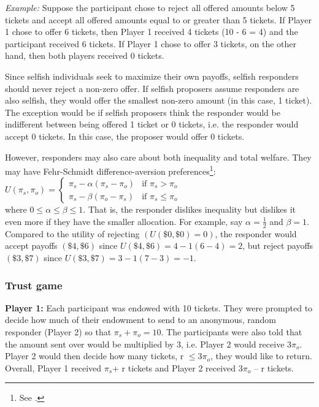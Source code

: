 \documentclass[12pt]{article}
\begin{document}
\textit{Example:} Suppose the participant chose to reject all offered amounts below 5 tickets and accept all offered amounts equal to or greater than 5 tickets. If Player 1 chose to offer 6 tickets, then Player 1 received 4 tickets (10 - 6 = 4) and the participant received 6 tickets. If Player 1 chose to offer 3 tickets, on the other hand, then both players received 0 tickets. 

Since selfish individuals seek to maximize their own payoffs, selfish responders should never reject a non-zero offer. If selfish proposers assume responders are also selfish, they would offer the smallest non-zero amount (in this case, 1 ticket). The exception would be if selfish proposers think the responder would be indifferent between being offered 1 ticket or 0 tickets, i.e. the responder would accept 0 tickets. In this case, the proposer would offer 0 tickets.


However, responders may also care about both inequality and total welfare. They may have Fehr-Schmidt difference-aversion preferences\footnote{See \cite{fehr_schmidt_1999}.}:\\

$ U(\pi_{s}, \pi_{o})  = \begin{cases}
      \pi_{s} - \alpha(\pi_{s} - \pi_{o}) & \text{if }\pi_{s} > \pi_{o} \\
      \pi_{s} - \beta(\pi_{o} - \pi_{s}) & \text{if }\pi_{s} \leq \pi_{o}
    \end{cases}\, $ \\

\noindent where $ 0 \leq \alpha \leq \beta \leq 1$. That is, the responder dislikes inequality but dislikes it even more if they have the smaller allocation. For example, say $\alpha = \frac{1}{2}$ and $\beta=1$. Compared to the utility of rejecting \((U(\$0, \$0) = 0)\), the responder would accept payoffs \((\$4, \$6)\) since \(U(\$4, \$6) = 4 - 1(6 - 4) =  2\), but reject payoffs \((\$3, \$7)\) since \(U(\$3,  \$7) = 3 - 1(7 - 3) = -1\).

	
\subsubsection{Trust game}
\textbf{Player 1:} Each participant was endowed with 10 tickets. They were prompted to decide how much of their endowment to send to an anonymous, random responder (Player 2) so that \(\pi_{s} + \pi_{o} = 10\). The participants were also told that the amount sent over would be multiplied by 3, i.e. Player 2 would receive 3\(\pi_{o}\). Player 2 would then decide how many tickets, r \(\leq 3\pi_{o}\), they would like to return. Overall, Player 1 received \(\pi_{s}\)+ r tickets and Player 2 received 3\(\pi_{o}\) -- r tickets.
\end{document}
